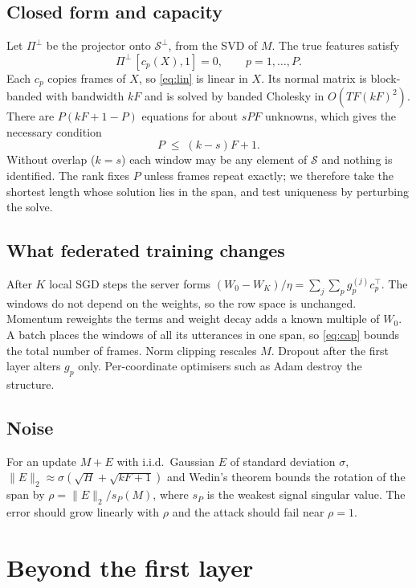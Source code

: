 \documentclass{Interspeech}
\begin{document}
\subsection{Closed form and capacity}
Let $\Pi^{\perp}$ be the projector onto $\mathcal{S}^{\perp}$, from the SVD of $M$. The true features
satisfy
\begin{equation}
\Pi^{\perp}\,[c_p(X),1]=0,\qquad p=1,\dots,P .
\label{eq:lin}
\end{equation}
Each $c_p$ copies frames of $X$, so \eqref{eq:lin} is linear in $X$. Its normal matrix is block-banded
with bandwidth $kF$ and is solved by banded Cholesky in $O(TF(kF)^2)$. There are $P(kF+1-P)$ equations
for about $sPF$ unknowns, which gives the necessary condition
\begin{equation}
P\;\le\;(k-s)F+1 .
\label{eq:cap}
\end{equation}
Without overlap ($k=s$) each window may be any element of $\mathcal{S}$ and nothing is identified. The
rank fixes $P$ unless frames repeat exactly; we therefore take the shortest length whose solution lies
in the span, and test uniqueness by perturbing the solve.

\subsection{What federated training changes}
After $K$ local SGD steps the server forms $(W_0-W_K)/\eta=\sum_{j}\sum_p g_p^{(j)}c_p^{\top}$. The
windows do not depend on the weights, so the row space is unchanged. Momentum reweights the terms and
weight decay adds a known multiple of $W_0$. A batch places the windows of all its utterances in one
span, so \eqref{eq:cap} bounds the total number of frames. Norm clipping rescales $M$. Dropout after the
first layer alters $g_p$ only. Per-coordinate optimisers such as Adam destroy the structure.

\subsection{Noise}
For an update $M+E$ with i.i.d.\ Gaussian $E$ of standard deviation $\sigma$,
$\lVert E\rVert_2\approx\sigma(\sqrt{H}+\sqrt{kF+1})$ and Wedin's theorem bounds the rotation of the span by
$\rho=\lVert E\rVert_2/s_P(M)$, where $s_P$ is the weakest signal singular value. The error should grow linearly
with $\rho$ and the attack should fail near $\rho=1$.

\section{Beyond the first layer}
\end{document}
